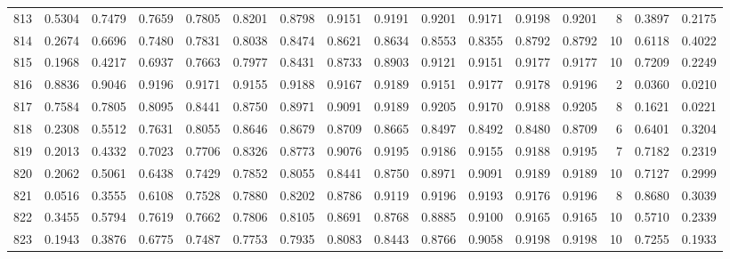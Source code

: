 \begin{tabular}{lrrrrrrrrrrrrrrr}
813 &      0.5304 &  0.7479 &  0.7659 &  0.7805 &  0.8201 &  0.8798 &  0.9151 &  0.9191 &  0.9201 &  0.9171 &   0.9198 &     0.9201 &      8 &                    0.3897 &                     0.2175 \\
814 &      0.2674 &  0.6696 &  0.7480 &  0.7831 &  0.8038 &  0.8474 &  0.8621 &  0.8634 &  0.8553 &  0.8355 &   0.8792 &     0.8792 &     10 &                    0.6118 &                     0.4022 \\
815 &      0.1968 &  0.4217 &  0.6937 &  0.7663 &  0.7977 &  0.8431 &  0.8733 &  0.8903 &  0.9121 &  0.9151 &   0.9177 &     0.9177 &     10 &                    0.7209 &                     0.2249 \\
816 &      0.8836 &  0.9046 &  0.9196 &  0.9171 &  0.9155 &  0.9188 &  0.9167 &  0.9189 &  0.9151 &  0.9177 &   0.9178 &     0.9196 &      2 &                    0.0360 &                     0.0210 \\
817 &      0.7584 &  0.7805 &  0.8095 &  0.8441 &  0.8750 &  0.8971 &  0.9091 &  0.9189 &  0.9205 &  0.9170 &   0.9188 &     0.9205 &      8 &                    0.1621 &                     0.0221 \\
818 &      0.2308 &  0.5512 &  0.7631 &  0.8055 &  0.8646 &  0.8679 &  0.8709 &  0.8665 &  0.8497 &  0.8492 &   0.8480 &     0.8709 &      6 &                    0.6401 &                     0.3204 \\
819 &      0.2013 &  0.4332 &  0.7023 &  0.7706 &  0.8326 &  0.8773 &  0.9076 &  0.9195 &  0.9186 &  0.9155 &   0.9188 &     0.9195 &      7 &                    0.7182 &                     0.2319 \\
820 &      0.2062 &  0.5061 &  0.6438 &  0.7429 &  0.7852 &  0.8055 &  0.8441 &  0.8750 &  0.8971 &  0.9091 &   0.9189 &     0.9189 &     10 &                    0.7127 &                     0.2999 \\
821 &      0.0516 &  0.3555 &  0.6108 &  0.7528 &  0.7880 &  0.8202 &  0.8786 &  0.9119 &  0.9196 &  0.9193 &   0.9176 &     0.9196 &      8 &                    0.8680 &                     0.3039 \\
822 &      0.3455 &  0.5794 &  0.7619 &  0.7662 &  0.7806 &  0.8105 &  0.8691 &  0.8768 &  0.8885 &  0.9100 &   0.9165 &     0.9165 &     10 &                    0.5710 &                     0.2339 \\
823 &      0.1943 &  0.3876 &  0.6775 &  0.7487 &  0.7753 &  0.7935 &  0.8083 &  0.8443 &  0.8766 &  0.9058 &   0.9198 &     0.9198 &     10 &                    0.7255 &                     0.1933 \\

\end{tabular}

